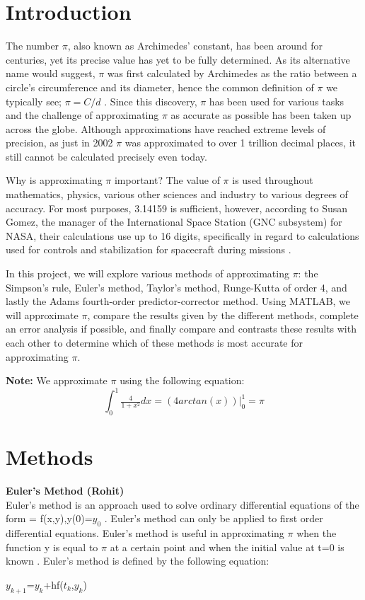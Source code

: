 \documentclass[letterpaper,12pt]{article}
\begin{document}
\section{Introduction}

The number $\pi$, also known as Archimedes' constant, has been around for centuries, yet its precise value has yet to be fully determined. As its alternative name would suggest, $\pi$ was first calculated by Archimedes as the ratio between a circle’s circumference and its diameter, hence the common definition of $\pi$ we typically see; $\pi = C/d$ \cite{Gorleau03}. Since this discovery, $\pi$ has been used for various tasks and the challenge of approximating $\pi$ as accurate as possible has been taken up across the globe. Although approximations have reached extreme levels of precision, as just in 2002 $\pi$ was approximated to over 1 trillion decimal places, it still cannot be calculated precisely even today. \par

Why is approximating $\pi$ important? The value of $\pi$ is used throughout mathematics, physics, various other sciences and industry to various degrees of accuracy. For most purposes, 3.14159 is sufficient, however, according to Susan Gomez, the manager of the International Space Station (GNC subsystem) for NASA, their calculations use up to 16 digits, specifically in regard to calculations used for controls and stabilization for spacecraft during missions \cite{Lamb12}.

In this project, we will explore various methods of approximating $\pi$: the Simpson’s rule, Euler’s method, Taylor’s method, Runge-Kutta of order 4, and lastly the Adams fourth-order predictor-corrector method. Using MATLAB, we will approximate $\pi$, compare the results given by the different methods, complete an error analysis if possible, and finally compare and contrasts these results with each other to determine which of these methods is most accurate for approximating $\pi$.

\textbf{Note:}
We approximate $\pi$ using the following equation: $$\int_{0}^{1} \tfrac{4}{1+x^2} dx = \left(4arctan(x)\right)\bigg|^{1}_{0}=\pi$$




\section{Methods}

    \item \textbf{Euler's Method (Rohit)}
    \\\indent Euler's method is an approach used to solve ordinary differential equations of the form  = f(x,y),y(0)=$y_{0}$ \cite{Kaw09}. Euler's method can only be applied to first order differential equations. Euler's method is useful in approximating $\pi$ when the function y is equal to $\pi$ at a certain point and when the initial value at t=0 is known \cite{Crowl01}. Euler's method is defined by the following equation: 
    \begin{center}$y_{k+1}$=$y_{k}$+hf($t_{k}$,$y_{k}$)
    \end{center}
    
\end{document}
